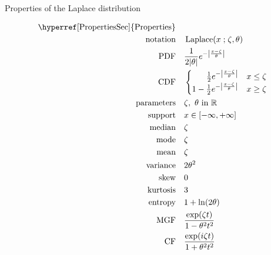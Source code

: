 

\begin{table*}[t!]
\caption[Laplace distribution -- Properties]{Properties of the Laplace distribution}
\begin{align*}
\text{\hyperref[PropertiesSec]{Properties}}  \quad& \\
\text{notation}\quad & \op{Laplace}(x\given \pLoc, \theta) 				\checked
\\ 
\text{PDF} \quad & \frac{1}{2 |\theta|} e^{- \Left|\frac{x-\pLoc}{\theta}\Right|} 	\checked
\\
\text{CDF} \quad & 
\begin{cases}
\phantom{\tfrac{1}{2} -\ } \frac{1}{2} e^{ - \Left|\frac{x-\pLoc}{\theta}\Right| } & x\leq \pLoc  \checked
\\
1 - \tfrac{1}{2} e^{ - \Left|\frac{x-\pLoc}{\theta}\Right| } & x\geq \pLoc 			\checked
\end{cases}
\\
\text{parameters}\quad & \pLoc,\ \theta \text{ in } \mathbb{R}				\checked
\\
\text{support} \quad & x \in [ -\infty, +\infty] 							\checked
\\
\text{median} \quad & \pLoc                            							\checked
\\
\text{mode} \quad & \pLoc 										\checked
\\
\text{mean} \quad & \pLoc  										\checked
\\
\text{variance} \quad & 2\theta^2 									\checked
\\
\text{skew} \quad & 0 											\checked
\\ 
\text{kurtosis} \quad & 3 											\checked
\\ 
\text{entropy} \quad & 1+ \ln( 2 \theta) 								\checked
\\ 
\text{MGF} \quad &  \frac{\exp(\pLoc t) }{1- \theta^2 t^2}					\checked
\\
\text{CF} \quad & \frac{\exp(i\pLoc t) }{1+ \theta^2 t^2}					\checked
\end{align*}
\end{table*}